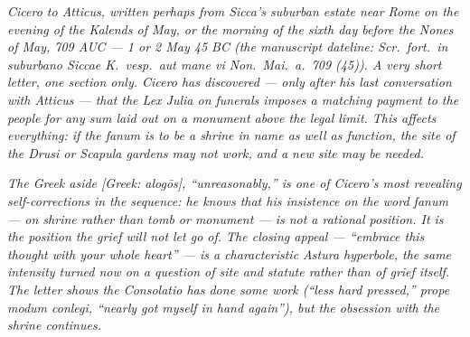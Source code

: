 
\textit{Cicero to Atticus, written perhaps from
Sicca's suburban estate near Rome on the evening
of the Kalends of May, or the morning of the sixth
day before the Nones of May, 709 AUC --- 1 or 2 May
45 BC (the manuscript dateline: \textit{Scr.\ fort.\
in suburbano Siccae K.\ vesp.\ aut mane vi Non.\
Mai.\ a.\ 709 (45)}). A very short letter, one
section only. Cicero has discovered --- only after
his last conversation with Atticus --- that the Lex
Julia on funerals imposes a matching payment to the
people for any sum laid out on a monument above the
legal limit. This affects everything: if the
\textit{fanum} is to be a shrine in name as well as
function, the site of the Drusi or Scapula gardens
may not work, and a new site may be needed.}

\textit{The Greek aside \textit{[Greek: alog\=os]},
``unreasonably,'' is one of Cicero's most revealing
self-corrections in the sequence: he knows that his
insistence on the word \textit{fanum} --- on
\textit{shrine} rather than tomb or monument --- is
not a rational position. It is the position the grief
will not let go of. The closing appeal --- ``embrace
this thought with your whole heart'' --- is a
characteristic Astura hyperbole, the same intensity
turned now on a question of site and statute rather
than of grief itself. The letter shows the
\textit{Consolatio} has done some work
(``less hard pressed,'' \textit{prope modum
conlegi}, ``nearly got myself in hand again''),
but the obsession with the shrine continues.}
